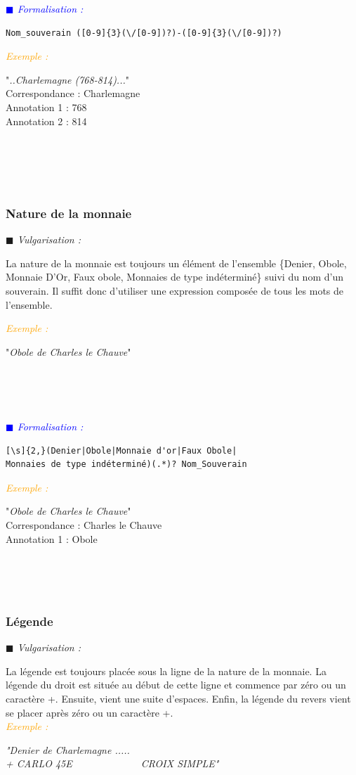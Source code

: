 \documentclass[a4paper, 11pt]{report}
\newenvironment{vulgarisation}
    {
    \textit{\textcolor{dark-blue}{$\blacksquare$  Vulgarisation : \\}}

    }
    {
    ~\\~\\
    }
\newenvironment{formalisation}
    {
    \textit{\textcolor{blue}{$\blacksquare$  Formalisation : \\}}
    }
    {
    ~\\~\\
    }
\newenvironment{exemple}
    {
    \textit{\textcolor{orange}{
    Exemple : \\}}
    }
    {
    ~\\
    }
\begin{document}
\begin{formalisation}
    \begin{verbatim}
Nom_souverain ([0-9]{3}(\/[0-9])?)-([0-9]{3}(\/[0-9])?)
    \end{verbatim}
    \begin{exemple}
        "\emph{..Charlemagne (768-814)...}" \\
        Correspondance : Charlemagne \\
        Annotation 1 : 768 \\
        Annotation 2 : 814
    \end{exemple}
\end{formalisation}

\subsubsection{Nature de la monnaie}
\begin{vulgarisation}
    La nature de la monnaie est toujours un élément de l'ensemble \{Denier, Obole, Monnaie D'Or, Faux obole, Monnaies de type indéterminé\} suivi du nom d'un souverain. Il suffit donc d'utiliser une expression composée de tous les mots de l'ensemble.
    
    \begin{exemple}
        "\emph{Obole de Charles le Chauve}" \\
    \end{exemple}
\end{vulgarisation}

\begin{formalisation}
    \begin{verbatim}
[\s]{2,}(Denier|Obole|Monnaie d'or|Faux Obole|
Monnaies de type indéterminé)(.*)? Nom_Souverain
    \end{verbatim}
    \begin{exemple}
        "\emph{Obole de Charles le Chauve}" \\
        Correspondance : Charles le Chauve \\
        Annotation 1 : Obole \\
    \end{exemple}
\end{formalisation}

\subsubsection{Légende}
\begin{vulgarisation}
    La légende est toujours placée sous la ligne de la nature de la monnaie. La légende du droit est située au début de cette ligne et commence par zéro ou un caractère +. Ensuite, vient une suite d'espaces. Enfin, la légende du revers vient se placer après zéro ou un caractère +.\\
    \begin{exemple}
        \emph{"Denier de Charlemagne ..... \\+ CARLO  45E~~~~~~~~~~~~~ CROIX SIMPLE"}\\
    \end{exemple}
\end{vulgarisation}
\end{document}
